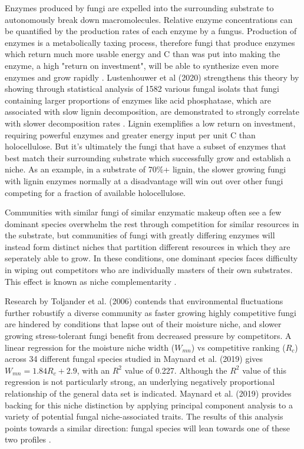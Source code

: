 \documentclass[12pt]{article}
\begin{document}
\begin{multicols}{2}
Enzymes produced by fungi are expelled into the surrounding substrate to autonomously break down macromolecules. Relative enzyme concentrations can be quantified by the production rates of each enzyme by a fungus. Production of enzymes is a metabolically taxing process, therefore fungi that produce enzymes which return much more usable energy and C than was put into making the enzyme, a high "return on investment", will be able to synthesize even more enzymes and grow rapidly \cite{Schimel2003}. Lustenhouwer et al (2020) strengthens this theory by showing through statistical analysis of 1582 various fungal isolats that fungi containing larger proportions of enzymes like acid phosphatase, which are associated with slow lignin decomposition, are demonstrated to strongly correlate with slower decomposition rates \cite{Lustenhouwer2020}. Lignin exemplifies a low return on investment, requiring powerful enzymes and greater energy input per unit C than holocellulose. But it's ultimately the fungi that have a subset of enzymes that best match their surrounding substrate which successfully grow and establish a niche. As an example, in a substrate of 70\%+ lignin, the slower growing fungi with lignin enzymes normally at a disadvantage will win out over other fungi competing for a fraction of available holocellulose.

Communities with similar fungi of similar enzymatic makeup often see a few dominant species overwhelm the rest through competition for similar resources in the substrate, but communities of fungi with greatly differing enzymes will instead form distinct niches that partition different resources in which they are seperately able to grow. In these conditions, one dominant species faces difficulty in wiping out competitors who are individually masters of their own substrates. This effect is known as niche complementarity \cite{Toljander2006}. 

Research by Toljander et al. (2006) contends that environmental fluctuations further robustify a diverse community as faster growing highly competitive fungi are hindered by conditions that lapse out of their moisture niche, and slower growing stress-tolerant fungi benefit from decreased pressure by competitors. A linear regression for the moisture niche width ($W_{mn}$) vs competitive ranking ($R_c$) across 34 different fungal species studied in Maynard et al. (2019) gives $W_{mn}= 1.84R_c + 2.9$, with an $R^2$ value of 0.227. Although the $R^2$ value of this regression is not particularly strong, an underlying negatively proportional relationship of the general data set is indicated. Maynard et al. (2019) provides backing for this niche distinction by applying principal component analysis to a variety of potential fungal niche-associated traits. The results of this analysis points towards a similar direction: fungal species will lean towards one of these two profiles \cite{Maynard2019}. 


\end{multicols}
\end{document}
